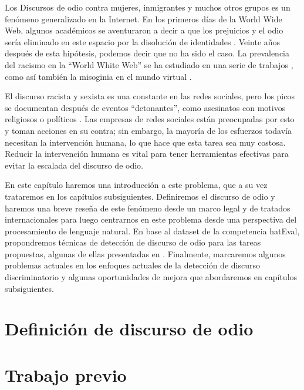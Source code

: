 \label{chap:04_hate_speech}

Los Discursos de odio contra mujeres, inmigrantes y muchos otros grupos es un fenómeno generalizado en la Internet. En los primeros días de la World Wide Web, algunos académicos se aventuraron a decir a que los prejuicios y el odio sería eliminado en este espacio por la disolución de identidades \cite{levy2001cyberculture, rheingold1993virtual}. Veinte años después de esta hipótesis, podemos
decir que no ha sido el caso. La prevalencia del racismo en la ``World White Web'' se ha estudiado en una serie de trabajos \cite{adams2005white, kettrey2014staking}, como así también la misoginia en el mundo virtual \cite{filipovic2007blogging, mantilla2013gendertrolling}.

El discurso racista y sexista es una constante en las redes sociales, pero los picos se documentan después de eventos ``detonantes'', como asesinatos con motivos religiosos o políticos \cite{burnap2015cyber}. Las empresas de redes sociales están preocupadas por esto y toman acciones en su contra; sin embargo, la mayoría de los esfuerzos todavía necesitan la intervención humana, lo que hace que esta tarea sea muy costosa. Reducir la intervención humana es vital para tener herramientas efectivas para evitar la escalada del discurso de odio.


En este capítulo haremos una introducción a este problema, que a su vez trataremos en los capítulos subsiguientes. Definiremos el discurso de odio y haremos una breve reseña de este fenómeno desde un marco legal y de tratados internacionales para luego centrarnos en este problema desde una perspectiva del procesamiento de lenguaje natural. En base al dataset de la competencia hatEval\cite{hateval2019semeval}, propondremos técnicas de detección de discurso de odio para las tareas propuestas, algunas de ellas presentadas en \citet{atalaya_tass2018}. Finalmente, marcaremos algunos problemas actuales en los enfoques actuales de la detección de discurso discriminatorio y algunas oportunidades de mejora que abordaremos en capítulos subsiguientes.


\section{Definición de discurso de odio}
\label{sec:hate_speech_definitions}



\section{Trabajo previo}

